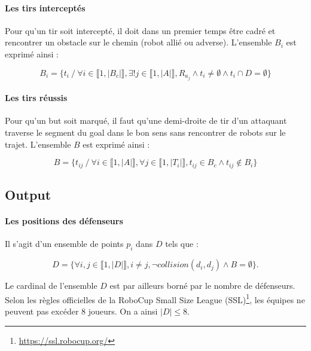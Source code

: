 \documentclass[12pt]{article}
\begin{document}
\paragraph{Les tirs interceptés}
Pour qu'un tir soit intercepté, il doit dans un premier temps être cadré et rencontrer un obstacle sur le chemin (robot allié ou adverse). L'ensemble $B_i$ est exprimé ainsi :

\begin{equation*}
    B_i = \{  t_i \ / \ \forall i \in \llbracket 1, |B_c| \rrbracket, \exists ! j \in \llbracket 1, |A| \rrbracket, R_{a_j} \wedge t_i \ne \emptyset \wedge t_i \cap D = \emptyset \} %
\end{equation*}



\paragraph{Les tirs réussis}
Pour qu'un but soit marqué, il faut qu'une demi-droite de tir d'un attaquant traverse le segment du goal dans le bon sens sans rencontrer de robots sur le trajet. L'ensemble $B$ est exprimé ainsi :

\begin{equation*}
    B = \{t_{ij} \ / \ \forall i \in \llbracket 1, |A| \rrbracket, \forall j \in \llbracket 1, |T_i| \rrbracket, t_{ij}  \in B_c \wedge t_{ij} \notin B_i  \} %
\end{equation*}



\subsection{Output}

\paragraph{Les positions des défenseurs} Il s'agit d'un ensemble de points $p_i$ dans $D$ tels que :

\begin{equation*}
D = \{ \forall i, j \in \llbracket 1, |D| \rrbracket, i \ne j, \neg collision(d_i, d_j) \wedge B = \emptyset \}.
\end{equation*}

Le cardinal de l'ensemble $D$ est par ailleurs borné par le nombre de défenseurs. Selon les règles officielles de la RoboCup Small Size League (SSL)\footnote{\url{https://ssl.robocup.org/}}, les équipes ne peuvent pas excéder 8 joueurs. On a ainsi $|D| \leqslant 8$.
\end{document}
